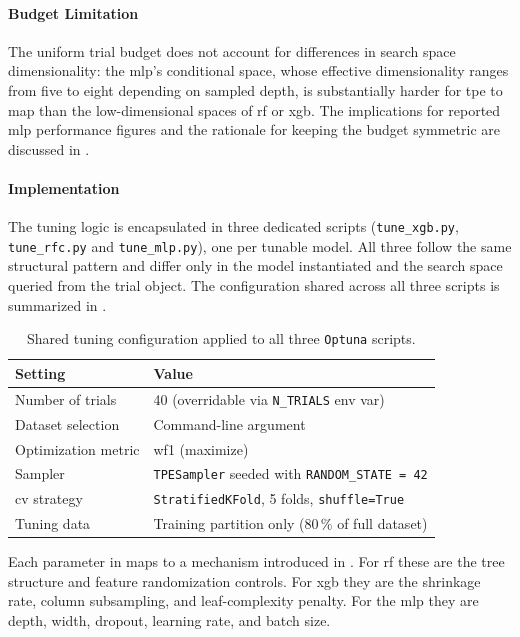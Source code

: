 \paragraph{Budget Limitation}
The uniform trial budget does not account for differences in search space dimensionality: the \gls{mlp}'s conditional space, whose effective dimensionality ranges from five to eight depending on sampled depth, is substantially harder for \gls{tpe} to map than the low-dimensional spaces of \gls{rf} or \gls{xgb}. The implications for reported \gls{mlp} performance figures and the rationale for keeping the budget symmetric are discussed in .

\paragraph{Implementation}
The tuning logic is encapsulated in three dedicated scripts (\texttt{tune\_xgb.py}, \texttt{tune\_rfc.py} and \texttt{tune\_mlp.py}), one per tunable model. All three follow the same structural pattern and differ only in the model instantiated and the search space queried from the trial object. The configuration shared across all three scripts is summarized in .

\begin{table}[htbp]
\centering
\caption{Shared tuning configuration applied to all three \texttt{Optuna} scripts.}
\label{tab:tuning_config}
\begin{tabular}{ll}
\toprule
\textbf{Setting} & \textbf{Value} \\
\midrule
Number of trials & 40 (overridable via \texttt{N\_TRIALS} env var) \\
Dataset selection & Command-line argument \\
Optimization metric & \gls{wf1} (maximize) \\
Sampler & \texttt{TPESampler} seeded with \texttt{RANDOM\_STATE = 42} \\
\gls{cv} strategy & \texttt{StratifiedKFold}, 5 folds, \texttt{shuffle=True} \\
Tuning data & Training partition only (80\,\% of full dataset) \\
\bottomrule
\end{tabular}
\end{table}

Each parameter in  maps to a mechanism introduced in . For \gls{rf} these are the tree structure and feature randomization controls. For \gls{xgb} they are the shrinkage rate, column subsampling, and leaf-complexity penalty. For the \gls{mlp} they are depth, width, dropout, learning rate, and batch size.

